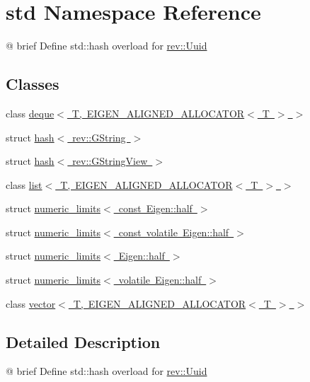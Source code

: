 \hypertarget{namespacestd}{}\section{std Namespace Reference}
\label{namespacestd}


@ brief Define std\+::hash overload for \mbox{\hyperlink{classrev_1_1_uuid}{rev\+::\+Uuid}}  


\subsection*{Classes}
\begin{DoxyCompactItemize}
\item 
class \mbox{\hyperlink{classstd_1_1deque_3_01_t_00_01_e_i_g_e_n___a_l_i_g_n_e_d___a_l_l_o_c_a_t_o_r_3_01_t_01_4_01_4}{deque$<$ T, E\+I\+G\+E\+N\+\_\+\+A\+L\+I\+G\+N\+E\+D\+\_\+\+A\+L\+L\+O\+C\+A\+T\+O\+R$<$ T $>$ $>$}}
\item 
struct \mbox{\hyperlink{structstd_1_1hash_3_01rev_1_1_g_string_01_4}{hash$<$ rev\+::\+G\+String $>$}}
\item 
struct \mbox{\hyperlink{structstd_1_1hash_3_01rev_1_1_g_string_view_01_4}{hash$<$ rev\+::\+G\+String\+View $>$}}
\item 
class \mbox{\hyperlink{classstd_1_1list_3_01_t_00_01_e_i_g_e_n___a_l_i_g_n_e_d___a_l_l_o_c_a_t_o_r_3_01_t_01_4_01_4}{list$<$ T, E\+I\+G\+E\+N\+\_\+\+A\+L\+I\+G\+N\+E\+D\+\_\+\+A\+L\+L\+O\+C\+A\+T\+O\+R$<$ T $>$ $>$}}
\item 
struct \mbox{\hyperlink{structstd_1_1numeric__limits_3_01const_01_eigen_1_1half_01_4}{numeric\+\_\+limits$<$ const Eigen\+::half $>$}}
\item 
struct \mbox{\hyperlink{structstd_1_1numeric__limits_3_01const_01volatile_01_eigen_1_1half_01_4}{numeric\+\_\+limits$<$ const volatile Eigen\+::half $>$}}
\item 
struct \mbox{\hyperlink{structstd_1_1numeric__limits_3_01_eigen_1_1half_01_4}{numeric\+\_\+limits$<$ Eigen\+::half $>$}}
\item 
struct \mbox{\hyperlink{structstd_1_1numeric__limits_3_01volatile_01_eigen_1_1half_01_4}{numeric\+\_\+limits$<$ volatile Eigen\+::half $>$}}
\item 
class \mbox{\hyperlink{classstd_1_1vector_3_01_t_00_01_e_i_g_e_n___a_l_i_g_n_e_d___a_l_l_o_c_a_t_o_r_3_01_t_01_4_01_4}{vector$<$ T, E\+I\+G\+E\+N\+\_\+\+A\+L\+I\+G\+N\+E\+D\+\_\+\+A\+L\+L\+O\+C\+A\+T\+O\+R$<$ T $>$ $>$}}
\end{DoxyCompactItemize}


\subsection{Detailed Description}
@ brief Define std\+::hash overload for \mbox{\hyperlink{classrev_1_1_uuid}{rev\+::\+Uuid}} 